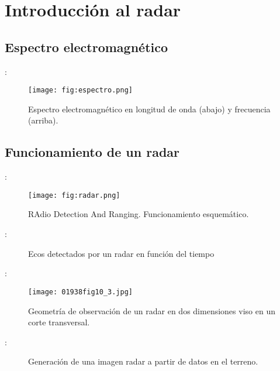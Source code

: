 \section{Introducción al radar}
\subsection{Espectro electromagnético}
\begin{frame}{\secname : \subsecname}
  \begin{figure}
    \centering
    \texttt{[image: fig:espectro.png]}
    \caption{Espectro electromagnético en longitud de onda (abajo) y frecuencia (arriba).}
    \label{}
  \end{figure}
\end{frame}

\subsection{Funcionamiento de un radar}
\begin{frame}{\secname : \subsecname}
    \begin{figure}
      \centering
      \texttt{[image: fig:radar.png]}
      \caption{RAdio Detection And Ranging. Funcionamiento esquemático.}
      \label{}
    \end{figure}
\end{frame}

\begin{frame}{\secname : \subsecname}
  \begin{figure}
    \centering
    \caption{Ecos detectados por un radar en función del tiempo}
    \label{}
  \end{figure}
\end{frame}

\begin{frame}{\secname : \subsecname}
  \begin{figure}
    \centering
    \texttt{[image: 01938fig10\_3.jpg]}
    \caption{Geometría de observación de un radar en dos dimensiones viso en un corte transversal.}
    \label{}
  \end{figure}
\end{frame}

\begin{frame}{\secname : \subsecname}
  \begin{figure}
    \centering
    \caption{Generación de una imagen radar a partir de datos en el terreno.}
    \label{}
  \end{figure}
\end{frame}


